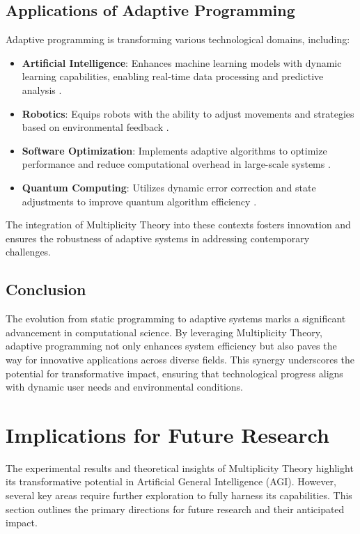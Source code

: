 \documentclass{article}
\theoremstyle{plain}
\begin{document}
\subsection{Applications of Adaptive Programming}
Adaptive programming is transforming various technological domains, including:
\begin{itemize}
    \item \textbf{Artificial Intelligence}: Enhances machine learning models with dynamic learning capabilities, enabling real-time data processing and predictive analysis \cite{schmidhuber2015deep}.
    \item \textbf{Robotics}: Equips robots with the ability to adjust movements and strategies based on environmental feedback \cite{silver2016mastering}.
    \item \textbf{Software Optimization}: Implements adaptive algorithms to optimize performance and reduce computational overhead in large-scale systems \cite{dean2013large}.
    \item \textbf{Quantum Computing}: Utilizes dynamic error correction and state adjustments to improve quantum algorithm efficiency \cite{nielsen2010quantum}.
\end{itemize}
The integration of Multiplicity Theory into these contexts fosters innovation and ensures the robustness of adaptive systems in addressing contemporary challenges.

\subsection{Conclusion}
The evolution from static programming to adaptive systems marks a significant advancement in computational science. By leveraging Multiplicity Theory, adaptive programming not only enhances system efficiency but also paves the way for innovative applications across diverse fields. This synergy underscores the potential for transformative impact, ensuring that technological progress aligns with dynamic user needs and environmental conditions.
\section{Implications for Future Research}

The experimental results and theoretical insights of Multiplicity Theory highlight its transformative potential in Artificial General Intelligence (AGI). However, several key areas require further exploration to fully harness its capabilities. This section outlines the primary directions for future research and their anticipated impact.
\end{document}
